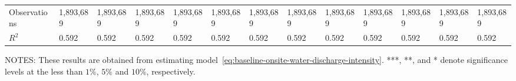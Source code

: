 \begin{table}[H]
{\begin{tabular}{@{}lllllllllllll@{}}
            Observations                                  & 1,893,689 & 1,893,689 & 1,893,689 & 1,893,689 & 1,893,689 & 1,893,689 & 1,893,689            & 1,893,689            & 1,893,689            & 1,893,689         & 1,893,689         & 1,893,689         \\
            $R^2$                                         & 0.592     & 0.592     & 0.592     & 0.592     & 0.592     & 0.592     & 0.592                & 0.592                & 0.592                & 0.592             & 0.592             & 0.592             \\ \bottomrule \bottomrule
        \end{tabular}%
    }
    \begin{minipage}{\columnwidth}
        \vspace{0.05in}
        \tiny NOTES: These results are obtained from estimating model~\ref{eq:baseline-onsite-water-discharge-intensity}. ***, **, and * denote significance levels at the less than $1\%$, $5\%$ and $10\%$, respectively.
    \end{minipage}
\end{table}